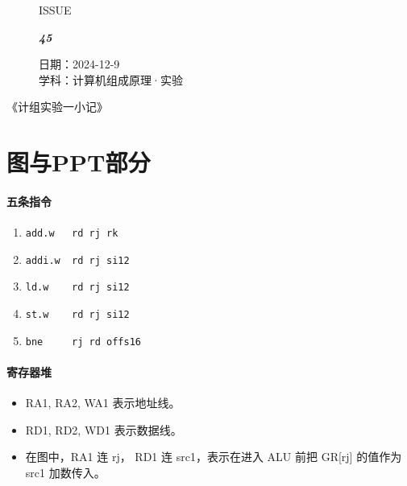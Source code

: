 \documentclass[UTF8]{ctexart}
\newcommand\Black[1]{\textcolor[gray]{0.3}{#1}}
\newcommand\Brown[1]{\textcolor[HTML]{998A4E}{#1}}
\newcommand\IssueNumber{45}
\newcommand\Date{2024-12-9}
\newcommand\Subject{计算机组成原理·实验}
\begin{document}
\begin{figure}[H]
\hspace{1cm}
\begin{minipage}[t]{0.3\textwidth}
\centering
    \Brown{\Genshin ISSUE}

    \vspace{-0.6cm}
    \Huge \Issue\slshape\bfseries\Black{\IssueNumber}
\end{minipage}
\hfill
\begin{minipage}[t]{0.28\textwidth}
\centering
    \Brown{日期：\Date} \\
\vspace{-0.1cm}
    \Brown{学科：\Subject} \\
\end{minipage}
\hspace{0.8cm}
\end{figure}

{\color{cyan!50!black}
\begin{center}
  《计组实验一小记》
\end{center}}

\section{图与PPT部分}

\paragraph{五条指令}
\begin{enumerate}
  \item \verb!add.w   rd rj rk!
  \item \verb!addi.w  rd rj si12!
  \item \verb!ld.w    rd rj si12!
  \item \verb!st.w    rd rj si12!
  \item \verb!bne     rj rd offs16!
\end{enumerate}

\paragraph{寄存器堆}
\begin{itemize}[itemsep=0pt,parsep=0pt]
  \item RA1, RA2, WA1 表示地址线。
  \item RD1, RD2, WD1 表示数据线。
  \item 在图中，RA1 连 rj， RD1 连 src1，表示在进入 ALU 前把 GR[rj] 的值作为 src1 加数传入。
\end{itemize}
\end{document}
